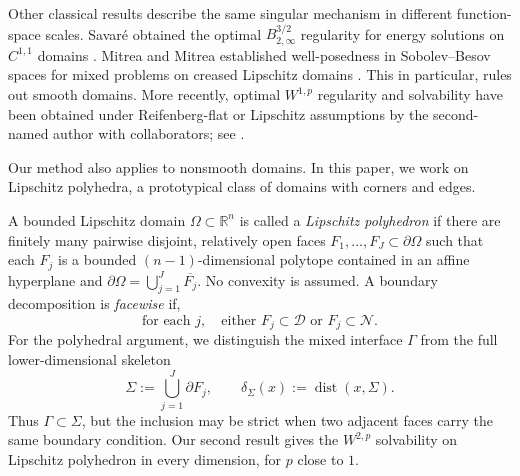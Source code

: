 \documentclass[12pt]{amsart}
\numberwithin{equation}{section}
\newcommand{\bR}{\mathbb{R}}
\newcommand\cD{\mathcal{D}}
\newcommand\cN{\mathcal{N}}
\newcommand\dist{\operatorname{dist}}
\newcommand{\p}{\partial}
\begin{document}
Other classical results describe the same singular mechanism in different
function-space scales. Savar\'e obtained the optimal
$B^{3/2}_{2,\infty}$ regularity for energy solutions on
$C^{1,1}$ domains \cite{Savare1997}. Mitrea and Mitrea established
well-posedness in Sobolev--Besov spaces for mixed problems on
creased Lipschitz domains \cite{MitreaMitrea2007}. This in particular, rules out smooth domains. More recently,
optimal $W^{1,p}$ regularity and solvability have
been obtained under Reifenberg-flat or Lipschitz assumptions by the second-named author with collaborators; see \cite{MR4232502,MR4261267}. 

\medskip

Our method also applies to nonsmooth domains. In this paper, we work on Lipschitz polyhedra, a prototypical class of domains with corners and edges. 

A bounded Lipschitz domain $\Omega\subset\bR^n$ is called a \emph{Lipschitz
polyhedron} if there are finitely many pairwise disjoint, relatively open
faces $F_1,\dots,F_J\subset\p\Omega$ such that each $F_j$ is a bounded
$(n-1)$-dimensional polytope contained in an affine hyperplane and $\p\Omega=\bigcup_{j=1}^J\overline{F_j}$.
No convexity is assumed. A boundary decomposition is \emph{facewise} if,
\begin{equation*}
    \text{for each}\,\, j,
    \quad
    \text{either}\,\,F_j \subset \cD \,\,\text{or}\,\, F_j\subset\cN.
\end{equation*}
For the polyhedral argument, we distinguish the mixed interface $\Gamma$ from the full lower-dimensional skeleton
\begin{equation}
 \Sigma:=\bigcup_{j=1}^J\p F_j,
 \qquad
 \delta_\Sigma(x):=\dist(x,\Sigma).
 \label{eq:polyhedral-skeleton}
\end{equation}
Thus $\Gamma\subset\Sigma$, but the inclusion may be strict when two adjacent faces carry the same boundary condition. Our second result gives the $W^{2,p}$ solvability on Lipschitz polyhedron in every dimension, for $p$ close to $1$.
\end{document}
